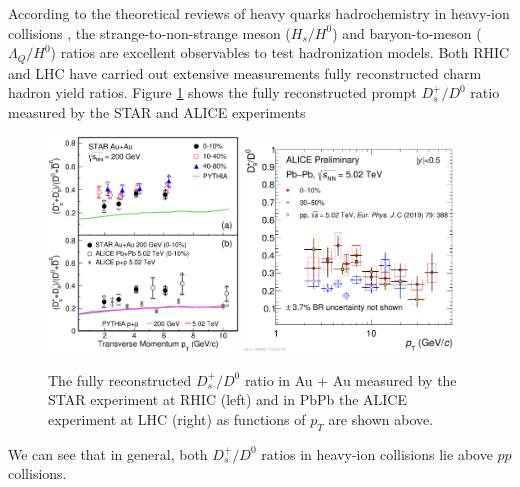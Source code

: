 According to the theoretical reviews of heavy quarks hadrochemistry in heavy-ion collisions \cite{StrangetoLight,BaryontoMeson}, the strange-to-non-strange meson ($H_s/H^0$) and baryon-to-meson ($\Lambda_{Q}/H^{0}$) ratios are excellent observables to test hadronization models. Both RHIC and LHC have carried out extensive measurements fully reconstructed charm hadron yield ratios. Figure \ref{HadroPlotCharm} shows the fully reconstructed prompt $D^+_s/D^0$ ratio measured by the STAR \cite{STARDsD0Ref} and ALICE \cite{ALICEDsD0Ref} experiments


\begin{figure}[hbtp]
\begin{center}
\includegraphics[width=0.45\textwidth]{Figures/Chapter2/STARDsD0.eps}
\includegraphics[width=0.51\textwidth]{Figures/Chapter2/ALICEDsD0.pdf}
\caption{The fully reconstructed $D_s^+/D^0$ ratio in Au + Au measured by the STAR experiment at RHIC (left) and in PbPb the ALICE experiment at LHC (right) as functions of $p_T$ are shown above.}
\label{HadroPlotCharm}
\end{center}
\end{figure}   


We can see that in general, both $D_s^+/D^0$ ratios in heavy-ion collisions lie above $pp$ collisions.

